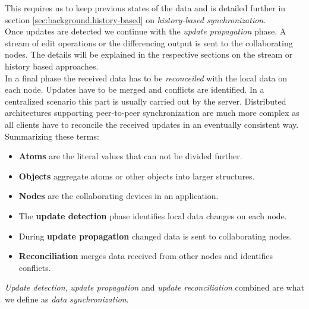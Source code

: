 This requires us to keep previous states of the data and is detailed further in section \ref{sec:background.history-based} on \emph{history-based synchronization}.\\
Once updates are detected we continue with the \emph{update propagation} phase.
A stream of edit operations or the differencing output is sent to the collaborating nodes.
The details will be explained in the respective sections on the stream or history based approaches.\\
In a final phase the received data has to be \emph{reconceiled} with the local data on each node.
Updates have to be merged and conflicts are identified.
In a centralized scenario this part is usually carried out by the server.
Distributed architectures supporting peer-to-peer synchronization are much more complex as all clients have to reconcile the received updates in an eventually consistent way.\\

Summarizing these terms:

\begin{itemize}
\item \textbf{Atoms} are the literal values that can not be divided further.
\item \textbf{Objects} aggregate atoms or other objects into larger structures.
\item \textbf{Nodes} are the collaborating devices in an application.
\item The \textbf{update detection} phase identifies local data changes on each node.
\item During \textbf{update propagation} changed data is sent to collaborating nodes.
\item \textbf{Reconciliation} merges data received from other nodes and identifies conflicts.
\end{itemize}

\emph{Update detection}, \emph{update propagation} and \emph{update reconciliation} combined are what we define as \emph{data synchronization}.

